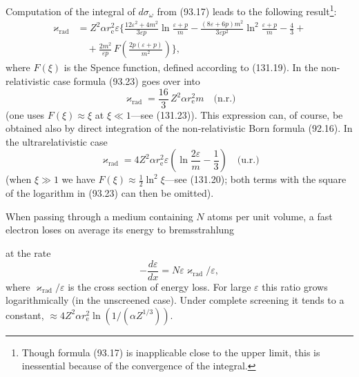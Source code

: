 Computation of the integral of $d\sigma_\omega$ from (93.17) leads to the following result\footnote{Though formula (93.17) is inapplicable close to the upper limit, this is inessential because of the convergence of the integral.}:
\begin{equation}
\begin{split}
\varkappa_\text{rad} &= Z^2\alpha r_\mathrm{e}^2\varepsilon\biggl\{\frac{12\varepsilon^2 + 4m^2}{3\varepsilon p}\ln\frac{\varepsilon+p}{m} - \frac{(8\varepsilon + 6p)m^2}{3\varepsilon p^2}\ln^2\frac{\varepsilon+p}{m} - \frac{4}{3} + {} \\
&\quad {} + \frac{2m^2}{\varepsilon p}\,F\!\left(\frac{2p(\varepsilon+p)}{m^2}\right)\biggr\},
\end{split}
\label{eq:93.23}
\end{equation}
where $F(\xi)$ is the Spence function, defined according to (131.19). In the non-relativistic case formula (93.23) goes over into
\begin{equation}
\varkappa_\text{rad} = \frac{16}{3}\,Z^2\alpha r_\mathrm{e}^2 m \quad \text{(n.r.)}
\label{eq:93.24}
\end{equation}
(one uses $F(\xi) \approx \xi$ at $\xi \ll 1$---see (131.23)). This expression can, of course, be obtained also by direct integration of the non-relativistic Born formula (92.16). In the ultrarelativistic case
\begin{equation}
\varkappa_\text{rad} = 4Z^2\alpha r_\mathrm{e}^2\varepsilon\left(\ln\frac{2\varepsilon}{m} - \frac{1}{3}\right) \quad \text{(u.r.)}
\label{eq:93.25}
\end{equation}
(when $\xi \gg 1$ we have $F(\xi) \approx \frac{1}{2}\ln^2\xi$---see (131.20); both terms with the square of the logarithm in (93.23) can then be omitted).

When passing through a medium containing $N$ atoms per unit volume, a fast electron loses on average its energy to bremsstrahlung

at the rate
\[
-\frac{d\varepsilon}{dx} = N\varepsilon\varkappa_\text{rad}/\varepsilon,
\]
where $\varkappa_\text{rad}/\varepsilon$ is the cross section of energy loss. For large $\varepsilon$ this ratio grows logarithmically (in the unscreened case). Under complete screening it tends to a constant, $\approx 4Z^2\alpha r_\mathrm{e}^2\ln(1/(\alpha Z^{1/3}))$.
